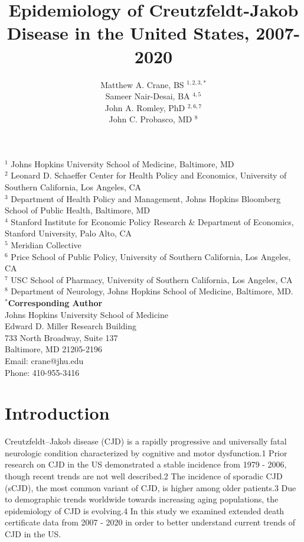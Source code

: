 \documentclass[12pt]{article}
\title{Epidemiology of Creutzfeldt-Jakob Disease in the United States, 2007-2020}
\author
{Matthew A. Crane, BS $^{1,2,3,\ast}$\\ 
Sameer Nair-Desai, BA $^{4,5}$ \\
John A. Romley, PhD $^{2,6,7}$ \\
John C. Probasco, MD $^{8}$\\}
\date{}
\begin{document}
 


\baselineskip 24pt


\maketitle

\small{\noindent$^{1}$ Johns Hopkins University School of Medicine, Baltimore, MD}\\
\small{$^{2}$ Leonard D. Schaeffer Center for Health Policy and Economics, University of Southern California, Los Angeles, CA}\\
\small{$^{3}$ Department of Health Policy and Management, Johns Hopkins Bloomberg School of Public 
Health, Baltimore, MD}\\
\small{$^{4}$ Stanford Institute for Economic Policy Research \& Department of Economics, Stanford University, Palo Alto, CA}\\
\small{$^{5}$ Meridian Collective}\\
\small{$^{6}$ Price School of Public Policy, University of Southern California, Los Angeles, CA}\\
\small{$^{7}$ USC School of Pharmacy, University of Southern California, Los Angeles, CA}\\
\small{$^{8}$ Department of Neurology, Johns Hopkins School of Medicine, Baltimore, MD.}\\

\small{\noindent \textbf{$^\ast$Corresponding Author} \\
Johns Hopkins University School of Medicine \\
Edward D. Miller Research Building \\
733 North Broadway, Suite 137 \\
Baltimore, MD 21205-2196 \\
Email: crane@jhu.edu \\ 
Phone: 410-955-3416}

\newpage

\section*{Introduction}

\par \bigskip
\noindent Creutzfeldt–Jakob disease (CJD) is a rapidly progressive and universally fatal neurologic condition characterized by cognitive and motor dysfunction.1 Prior research on CJD in the US demonstrated a stable incidence from 1979 - 2006, though recent trends are not well described.2 The incidence of sporadic CJD (sCJD), the most common variant of CJD, is higher among older patients.3 Due to demographic trends worldwide towards increasing aging populations, the epidemiology of CJD is evolving.4 In this study we examined extended death certificate data from 2007 - 2020 in order to better understand current trends of CJD in the US.
\end{document}
